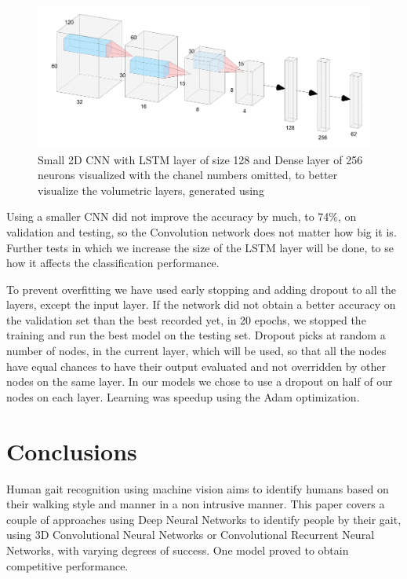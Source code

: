 \documentclass[12pt]{article}
\theoremstyle{definition}
\begin{document}
	\begin{figure}
		\includegraphics[width=\textwidth]{networks/small-2D-CNN-LSTM-Dense.png}
		\caption{Small 2D CNN with LSTM layer of size 128 and Dense layer of 256 neurons visualized with the chanel numbers omitted, to better visualize the volumetric layers, generated using \cite{nn-svg}}
		\label{figure:small-2D-CNN-LSTM-Dense}
	\end{figure}

	Using a smaller CNN did not improve the accuracy by much, to 74\%, on validation and testing, so the Convolution network does not matter how big it is. Further tests in which we increase the size of the LSTM layer will be done, to se how it affects the classification performance.

	To prevent overfitting we have used early stopping and adding dropout to all the layers, except the input layer. If the network did not obtain a better accuracy on the validation set than the best recorded yet, in 20 epochs, we stopped the training and run the best model on the testing set. Dropout picks at random a number of nodes, in the current layer, which will be used, so that all the nodes have equal chances to have their output evaluated and not overridden by other nodes on the same layer. In our models we chose to use a dropout on half of our nodes on each layer. Learning was speedup using the Adam optimization.

	\clearpage

	\section{Conclusions}
	\vspace{1cm}

	Human gait recognition using machine vision aims to identify humans based on their walking style and manner in a non intrusive manner. This paper covers a couple of approaches using Deep Neural Networks to identify people by their gait, using 3D Convolutional Neural Networks or Convolutional Recurrent Neural Networks, with varying degrees of success. One model proved to obtain competitive performance.
\end{document}
